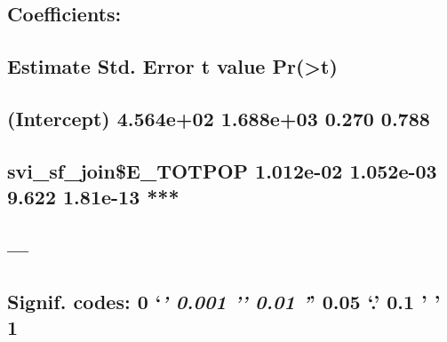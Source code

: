 \documentclass[
  12pt,
]{article}
\begin{document}
\hypertarget{section-47}{%
\subsection{}\label{section-47}}

\hypertarget{coefficients-4}{%
\subsection{Coefficients:}\label{coefficients-4}}

\hypertarget{estimate-std.-error-t-value-prt-4}{%
\subsection{Estimate Std. Error t value
Pr(\textgreater\textbar t\textbar)}\label{estimate-std.-error-t-value-prt-4}}

\hypertarget{intercept-4.564e02-1.688e03-0.270-0.788}{%
\subsection{(Intercept) 4.564e+02 1.688e+03 0.270
0.788}\label{intercept-4.564e02-1.688e03-0.270-0.788}}

\hypertarget{svi_sf_joine_totpop-1.012e-02-1.052e-03-9.622-1.81e-13}{%
\subsection{svi\_sf\_join\$E\_TOTPOP 1.012e-02 1.052e-03 9.622 1.81e-13
***}\label{svi_sf_joine_totpop-1.012e-02-1.052e-03-9.622-1.81e-13}}

\hypertarget{section-48}{%
\subsection{---}\label{section-48}}

\hypertarget{signif.-codes-0-0.001-0.01-0.05-.-0.1-1-4}{%
\subsection{\texorpdfstring{Signif. codes: 0 `\emph{\textbf{' 0.001 '}'
0.01 '}' 0.05 `.' 0.1 ' '
1}{Signif. codes: 0 `\,' 0.001 '\,' 0.01 '\,' 0.05 `.' 0.1 ' ' 1}}\label{signif.-codes-0-0.001-0.01-0.05-.-0.1-1-4}}

\hypertarget{section-49}{%
\subsection{}\label{section-49}}
\end{document}
